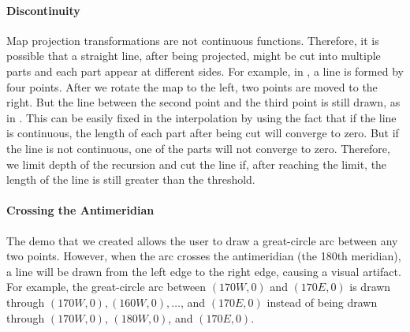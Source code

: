 \paragraph{Discontinuity}

Map projection transformations are not continuous functions. Therefore, it is possible that a straight line, after being projected, might be cut into multiple parts and each part appear at different sides. For example, in , a line is formed by four points. After we rotate the map to the left, two points are moved to the right. But the line between the second point and the third point is still drawn, as in . This can be easily fixed in the interpolation by using the fact that if the line is continuous, the length of each part after being cut will converge to zero. But if the line is not continuous, one of the parts will not converge to zero. Therefore, we limit depth of the recursion and cut the line if, after reaching the limit, the length of the line is still greater than the threshold.




\paragraph{Crossing the Antimeridian}


The demo that we created allows the user to draw a great-circle arc between any two points. However, when the arc crosses the antimeridian (the 180th meridian), a line will be drawn from the left edge to the right edge, causing a visual artifact. For example, the great-circle arc between $(170W, 0)$ and $(170E, 0)$ is drawn through  $(170W, 0), (160W, 0), \dots$, and $(170E, 0)$ instead of being drawn through $(170W, 0)$, $(180W, 0)$, and $(170E, 0)$.



